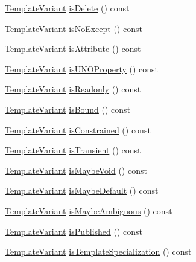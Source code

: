 \begin{DoxyCompactItemize}
\item 
\hyperlink{class_template_variant}{Template\+Variant} \hyperlink{class_member_context_1_1_private_a707ad10e99ddfcdd84cfd03ac1f1dfa0}{is\+Delete} () const 
\item 
\hyperlink{class_template_variant}{Template\+Variant} \hyperlink{class_member_context_1_1_private_aaacb4d573132771b73eadcb23e05e9aa}{is\+No\+Except} () const 
\item 
\hyperlink{class_template_variant}{Template\+Variant} \hyperlink{class_member_context_1_1_private_a093711e2336bfc3fd467aa1a8768e53f}{is\+Attribute} () const 
\item 
\hyperlink{class_template_variant}{Template\+Variant} \hyperlink{class_member_context_1_1_private_a6dd9543cbc16865c4d3837dcab0d983e}{is\+U\+N\+O\+Property} () const 
\item 
\hyperlink{class_template_variant}{Template\+Variant} \hyperlink{class_member_context_1_1_private_a4a191a682c7f5be4f0ac6e6498a6fff7}{is\+Readonly} () const 
\item 
\hyperlink{class_template_variant}{Template\+Variant} \hyperlink{class_member_context_1_1_private_a5686bb62c0e16d169cfe7368939d19fe}{is\+Bound} () const 
\item 
\hyperlink{class_template_variant}{Template\+Variant} \hyperlink{class_member_context_1_1_private_a5530e790fa9a1f89b849c605540d68ee}{is\+Constrained} () const 
\item 
\hyperlink{class_template_variant}{Template\+Variant} \hyperlink{class_member_context_1_1_private_a3ac0d404a348b567daf2fb881551d29f}{is\+Transient} () const 
\item 
\hyperlink{class_template_variant}{Template\+Variant} \hyperlink{class_member_context_1_1_private_a4a67b56ffc6a39e3588f126bbf88cc25}{is\+Maybe\+Void} () const 
\item 
\hyperlink{class_template_variant}{Template\+Variant} \hyperlink{class_member_context_1_1_private_a8716df8f8f317068528c4fe675479159}{is\+Maybe\+Default} () const 
\item 
\hyperlink{class_template_variant}{Template\+Variant} \hyperlink{class_member_context_1_1_private_a14412685ce5274716f34b1e9cc3c1349}{is\+Maybe\+Ambiguous} () const 
\item 
\hyperlink{class_template_variant}{Template\+Variant} \hyperlink{class_member_context_1_1_private_a94e84e7f107f2bed5c22f4668e3db19f}{is\+Published} () const 
\item 
\hyperlink{class_template_variant}{Template\+Variant} \hyperlink{class_member_context_1_1_private_a204cb68b033152936731316123a348d7}{is\+Template\+Specialization} () const 

\end{DoxyCompactItemize}

